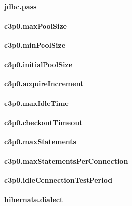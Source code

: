 \documentclass[12pt,a4paper]{report}
\begin{document}
\paragraph{jdbc.pass}


\paragraph{c3p0.maxPoolSize}

\paragraph{c3p0.minPoolSize}

\paragraph{c3p0.initialPoolSize}

\paragraph{c3p0.acquireIncrement}

\paragraph{c3p0.maxIdleTime}

\paragraph{c3p0.checkoutTimeout}

\paragraph{c3p0.maxStatements}

\paragraph{c3p0.maxStatementsPerConnection}

\paragraph{c3p0.idleConnectionTestPeriod}

\paragraph{hibernate.dialect}
\end{document}
